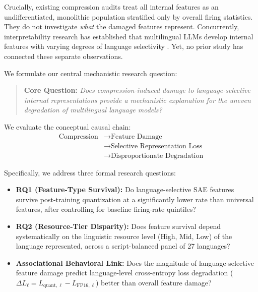 \documentclass[11pt]{article}
\begin{document}
Crucially, existing compression audits treat all internal features as an undifferentiated, monolithic population stratified only by overall firing statistics. They do not investigate \emph{what} the damaged features represent. Concurrently, interpretability research has established that multilingual LLMs develop internal features with varying degrees of language selectivity \citep{deng2025unveiling, sin2025uncovering}. Yet, no prior study has connected these separate observations.

We formulate our central mechanistic research question:
\begin{quote}
\textbf{Core Question:} \emph{Does compression-induced damage to language-selective internal representations provide a mechanistic explanation for the uneven degradation of multilingual language models?}
\end{quote}

We evaluate the conceptual causal chain:
\begin{equation}
\label{eq:chain}
\boxed{
\begin{aligned}
\text{Compression} &\longrightarrow \text{Feature Damage} \\
&\longrightarrow \text{Selective Representation Loss} \\
&\longrightarrow \text{Disproportionate Degradation}
\end{aligned}
}
\end{equation}

Specifically, we address three formal research questions:
\begin{itemize}
    \item \textbf{RQ1 (Feature-Type Survival):} Do language-selective SAE features survive post-training quantization at a significantly lower rate than universal features, after controlling for baseline firing-rate quintiles?
    \item \textbf{RQ2 (Resource-Tier Disparity):} Does feature survival depend systematically on the linguistic resource level (High, Mid, Low) of the language represented, across a script-balanced panel of 27 languages?
    \item \textbf{Associational Behavioral Link:} Does the magnitude of language-selective feature damage predict language-level cross-entropy loss degradation ($\Delta L_\ell = L_{\text{quant},\ell} - L_{\text{FP16},\ell}$) better than overall feature damage?
\end{itemize}
\end{document}
